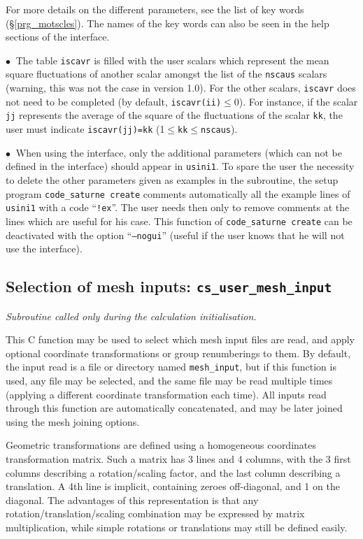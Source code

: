 {{For more details on the different parameters, see the list of key words  (\S\ref{prg_motscles}).
 The names of the key words can also be seen in the help sections of the interface.

$\bullet\ $ The table \texttt{iscavr} is filled with the user scalars which represent the mean square fluctuations of another scalar amongst the list of the \texttt{nscaus} scalars (warning, this was not the case in version 1.0). For the other scalars, \texttt{iscavr} does not need to be completed (by default,
\texttt{iscavr(ii)}$\leqslant$0). For instance, if the scalar \texttt{jj}
represents the average of the square of the fluctuations of the scalar \texttt{kk},
the user must indicate \texttt{iscavr(jj)=kk}
(1$\leqslant$\texttt{kk}$\leqslant$\texttt{nscaus}).

\noindent
$\bullet\ $ When using the interface, only the
additional parameters (which can not be defined in the interface)
should appear in \texttt{usini1}. To spare the user the necessity to
delete the other parameters given as examples in the subroutine, the
setup program \texttt{code\_saturne~create} comments automatically all the
example lines of \texttt{usini1} with a code ``\texttt{!ex}''. The user
needs then only to remove comments at the lines which are useful for his
case. This function of
\texttt{code\_saturne~create} can be deactivated with
the option ``\texttt{--nogui}'' (useful if the user knows that he will not
use the interface).

\subsection{Selection of mesh inputs: \textmd{\texttt{cs\_user\_mesh\_input}}}

\noindent
\textit{Subroutine called only during the calculation initialisation.}

This C function may be used to select which mesh input files
are read, and apply optional coordinate transformations or group renumberings
to them. By default, the input read is a file or directory named
\texttt{mesh\_input}, but if this function is used, any file may be selected,
and the same file may be read multiple times (applying a different
coordinate transformation each time).
All inputs read through this function are automatically concatenated, and
may be later joined using the mesh joining options.

Geometric transformations are defined using a homogeneous coordinates
transformation matrix. Such a matrix has 3 lines and 4 columns, with the
3 first columns describing a rotation/scaling factor, and the last column
describing a translation. A 4th line is implicit, containing zeroes
off-diagonal, and 1 on the diagonal. The advantages of this representation
is that any rotation/translation/scaling combination may be expressed
by matrix multiplication, while simple rotations or translations
may still be defined easily.

}}
